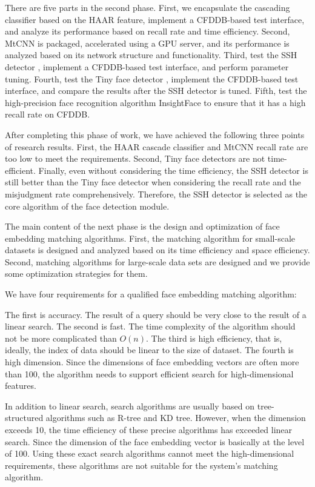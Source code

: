 \begin{bigabstract}
There are five parts in the second phase. First, we encapsulate the cascading classifier \cite{viola2004robust} based on the HAAR feature, implement a CFDDB-based test interface, and analyze its performance based on recall rate and time efficiency. Second, MtCNN\cite{zhang2016joint} is packaged, accelerated using a GPU server, and its performance is analyzed based on its network structure and functionality. Third, test the SSH detector \cite{najibi2017ssh}, implement a CFDDB-based test interface, and perform parameter tuning. Fourth, test the Tiny face detector \cite{hu2017finding}, implement the CFDDB-based test interface, and compare the results after the SSH detector is tuned. Fifth, test the high-precision face recognition algorithm InsightFace\cite{deng2018arcface} to ensure that it has a high recall rate on CFDDB.


After completing this phase of work, we have achieved the following three points of research results. First, the HAAR cascade classifier and MtCNN recall rate are too low to meet the requirements. Second, Tiny face detectors are not time-efficient. Finally, even without considering the time efficiency, the SSH detector is still better than the Tiny face detector when considering the recall rate and the misjudgment rate comprehensively. Therefore, the SSH detector is selected as the core algorithm of the face detection module.

The main content of the next phase is the design and optimization of face embedding matching algorithms. First, the matching algorithm for small-scale datasets is designed and analyzed based on its time efficiency and space efficiency. Second, matching algorithms for large-scale data sets are designed and we provide some optimization strategies for them.

We have four requirements for a qualified face embedding matching algorithm:

The first is accuracy. The result of a query should be very close to the result of a linear search. The second is fast. The time complexity of the algorithm should not be more complicated than $O(n)$. The third is high efficiency, that is, ideally, the index of data should be linear to the size of dataset. The fourth is high dimension. Since the dimensions of face embedding vectors are often more than 100, the algorithm needs to support efficient search for high-dimensional features.

In addition to linear search, search algorithms are usually based on tree-structured algorithms such as R-tree and KD tree. However, when the dimension exceeds 10, the time efficiency of these precise algorithms has exceeded linear search\cite{weber1998quantitative}. Since the dimension of the face embedding vector is basically at the level of 100. Using these exact search algorithms cannot meet the high-dimensional requirements, these algorithms are not suitable for the system's matching algorithm.


\end{bigabstract}
